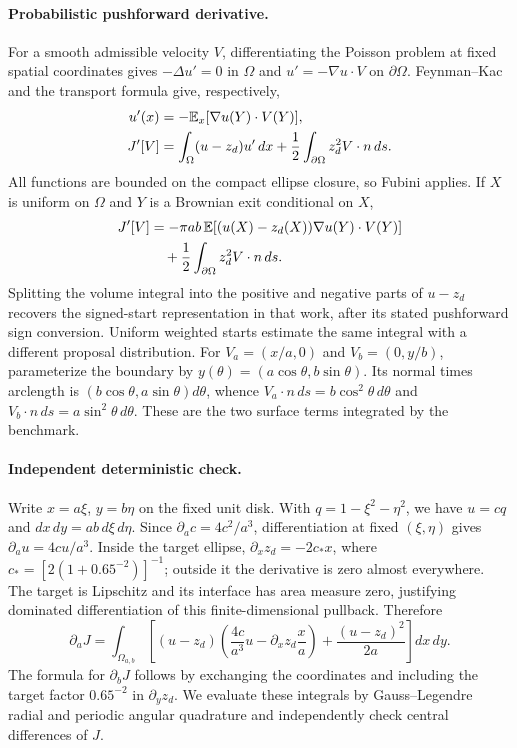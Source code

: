 \paragraph{Probabilistic pushforward derivative.}
For a smooth admissible velocity $V$, differentiating the Poisson problem at
fixed spatial coordinates gives $-\Delta u'=0$ in $\Omega$ and
$u'=-\nabla u\cdot V$ on $\partial\Omega$.  Feynman--Kac and the transport
formula give, respectively,
\begin{align}
 u'(x)&=-\mathbb{E}_x[\nabla u(Y)\cdot V(Y)],\\
 J'[V]&=\int_\Omega(u-z_d)u'\,dx
          +\frac12\int_{\partial\Omega}z_d^2 V\cdot n\,ds.
\end{align}
All functions are bounded on the compact ellipse closure, so Fubini applies.
If $X$ is uniform on $\Omega$ and $Y$ is a Brownian exit conditional on $X$,
\begin{align}
 J'[V]&=-\pi ab\,\mathbb{E}[(u(X)-z_d(X))\nabla u(Y)\cdot V(Y)]\\
       &\quad+\frac12\int_{\partial\Omega}z_d^2 V\cdot n\,ds.
\end{align}
Splitting the volume integral into the positive and negative parts of
$u-z_d$ recovers the signed-start representation in that work, after its
stated pushforward sign conversion.  Uniform weighted starts estimate the
same integral with a different proposal distribution.
For $V_a=(x/a,0)$ and $V_b=(0,y/b)$, parameterize the boundary by
$y(\theta)=(a\cos\theta,b\sin\theta)$.  Its normal times arclength is
$(b\cos\theta,a\sin\theta)d\theta$, whence
$V_a\cdot n\,ds=b\cos^2\theta\,d\theta$ and
$V_b\cdot n\,ds=a\sin^2\theta\,d\theta$.  These are the two surface terms
integrated by the benchmark.

\paragraph{Independent deterministic check.}
Write $x=a\xi$, $y=b\eta$ on the fixed unit disk.  With
$q=1-\xi^2-\eta^2$, we have $u=cq$ and $dx\,dy=ab\,d\xi\,d\eta$.
Since $\partial_a c=4c^2/a^3$, differentiation at fixed $(\xi,\eta)$ gives
$\partial_a u=4cu/a^3$.  Inside the target ellipse,
$\partial_xz_d=-2c_*x$, where $c_*=[2(1+0.65^{-2})]^{-1}$;
outside it the derivative is zero almost everywhere.  The target is
Lipschitz and its interface has area measure zero, justifying dominated
differentiation of this finite-dimensional pullback.  Therefore
\begin{equation}
 \partial_a J=\int_{\Omega_{a,b}}
 \left[(u-z_d)\left(\frac{4c}{a^3}u-\partial_xz_d\frac{x}{a}\right)
                   +\frac{(u-z_d)^2}{2a}\right]dx\,dy.
\end{equation}
The formula for $\partial_b J$ follows by exchanging the coordinates and
including the target factor $0.65^{-2}$ in $\partial_yz_d$.
We evaluate these integrals by Gauss--Legendre radial and periodic angular
quadrature and independently check central differences of $J$.

